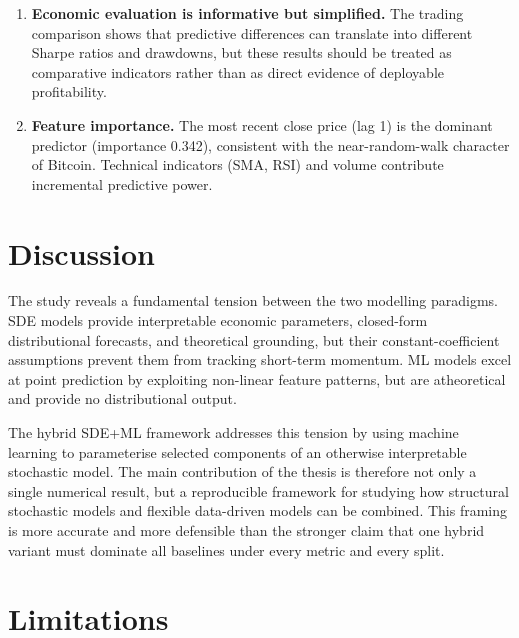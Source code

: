 \documentclass[12pt, a4paper, oneside]{report}
\theoremstyle{plain}
\theoremstyle{definition}
\theoremstyle{remark}
\begin{document}
\begin{enumerate}[leftmargin=1.25cm, label=\arabic*.]
  \item \textbf{Economic evaluation is informative but simplified.}  The
    trading comparison shows that predictive differences can translate into
    different Sharpe ratios and drawdowns, but these results should be treated
    as comparative indicators rather than as direct evidence of deployable
    profitability.

  \item \textbf{Feature importance.}  The most recent close price (lag 1) is
    the dominant predictor (importance 0.342), consistent with the near-random-walk
    character of Bitcoin.  Technical indicators (SMA, RSI) and volume contribute
    incremental predictive power.
\end{enumerate}

\section*{Discussion}

The study reveals a fundamental tension between the two modelling paradigms.
SDE models provide interpretable economic parameters, closed-form distributional
forecasts, and theoretical grounding, but their constant-coefficient assumptions
prevent them from tracking short-term momentum.  ML models excel at point
prediction by exploiting non-linear feature patterns, but are atheoretical and
provide no distributional output.

The hybrid SDE+ML framework addresses this tension by using machine learning to
parameterise selected components of an otherwise interpretable stochastic model.
The main contribution of the thesis is therefore not only a single numerical
result, but a reproducible framework for studying how structural stochastic
models and flexible data-driven models can be combined.  This framing is more
accurate and more defensible than the stronger claim that one hybrid variant
must dominate all baselines under every metric and every split.

\section*{Limitations}
\end{document}
